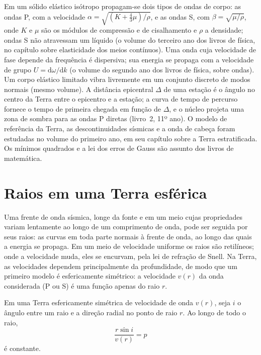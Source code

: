 \begin{recall}
Em um sólido elástico isótropo propagam-se dois tipos de ondas de corpo: as ondas P, com a
velocidade $\alpha = \sqrt{(K + \tfrac43\mu)/\rho}$, e as ondas S, com
$\beta = \sqrt{\mu/\rho}$, onde $K$ e $\mu$ são os módulos de compressão e de cisalhamento
e $\rho$ a densidade; ondas S não atravessam um líquido (o volume do terceiro ano dos
livros de física, no capítulo sobre elasticidade dos meios contínuos). Uma onda cuja velocidade de fase
depende da frequência é dispersiva; sua energia se propaga com a
velocidade de grupo $U = \mathrm d\omega/\mathrm dk$ (o volume do segundo ano dos livros de física, sobre
ondas). Um corpo elástico limitado vibra livremente em um conjunto discreto de modos
normais (mesmo volume). A distância epicentral $\Delta$ de uma estação é o ângulo
no centro da Terra entre o epicentro e a estação; a curva de tempo de
percurso fornece o tempo de primeira chegada em função de $\Delta$, e o núcleo projeta uma
zona de sombra para as ondas P diretas (livro~2, 11º ano). O modelo de referência da Terra,
as descontinuidades sísmicas e a onda de cabeça foram estudadas no volume do primeiro ano,
em seu capítulo sobre a Terra estratificada. Os mínimos quadrados e a lei dos
erros de Gauss são assunto dos livros de matemática.
\end{recall}

\section{Raios em uma Terra esférica}

Uma frente de onda sísmica, longe da fonte e em um meio cujas propriedades
variam lentamente ao longo de um comprimento de onda, pode ser seguida por seus raios: as curvas
em toda parte normais à frente de onda, ao longo das quais a energia se propaga. Em um
meio de velocidade uniforme os raios são retilíneos; onde a velocidade muda, eles
se encurvam, pela lei de refração de Snell. Na Terra, as velocidades dependem principalmente da
profundidade, de modo que um primeiro modelo é esfericamente simétrico: a velocidade $v(r)$ da
onda considerada (P ou S) é uma função apenas do raio $r$.

\begin{theorem}\label{thm:b3:seismology-imaging:snell}
Em uma Terra esfericamente simétrica de velocidade de onda $v(r)$, seja $i$ o ângulo
entre um raio e a direção radial no ponto de raio $r$. Ao longo de todo o raio,
\[
  \frac{r\sin i}{v(r)} = p
\]
é constante.
\end{theorem}

